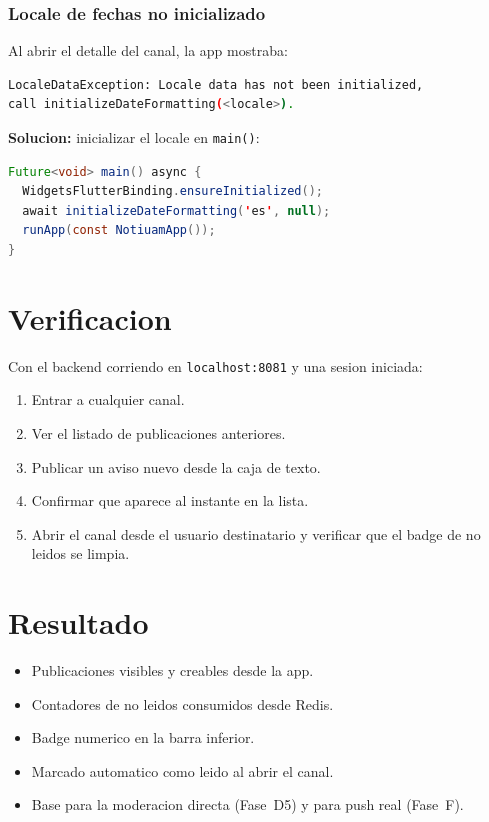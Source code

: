\subsubsection{Locale de fechas no inicializado}

Al abrir el detalle del canal, la app mostraba:

\begin{lstlisting}[language=bash]
LocaleDataException: Locale data has not been initialized,
call initializeDateFormatting(<locale>).
\end{lstlisting}

\textbf{Solucion:} inicializar el locale en \texttt{main()}:

\begin{lstlisting}[language=Java]
Future<void> main() async {
  WidgetsFlutterBinding.ensureInitialized();
  await initializeDateFormatting('es', null);
  runApp(const NotiuamApp());
}
\end{lstlisting}

\section{Verificacion}

Con el backend corriendo en \texttt{localhost:8081} y una sesion iniciada:

\begin{enumerate}[leftmargin=*]
  \item Entrar a cualquier canal.
  \item Ver el listado de publicaciones anteriores.
  \item Publicar un aviso nuevo desde la caja de texto.
  \item Confirmar que aparece al instante en la lista.
  \item Abrir el canal desde el usuario destinatario y verificar que el badge de no leidos se limpia.
\end{enumerate}

\section{Resultado}

\begin{exito}
\begin{itemize}[leftmargin=*]
  \item Publicaciones visibles y creables desde la app.
  \item Contadores de no leidos consumidos desde Redis.
  \item Badge numerico en la barra inferior.
  \item Marcado automatico como leido al abrir el canal.
  \item Base para la moderacion directa (Fase~D5) y para push real (Fase~F).
\end{itemize}
\end{exito}